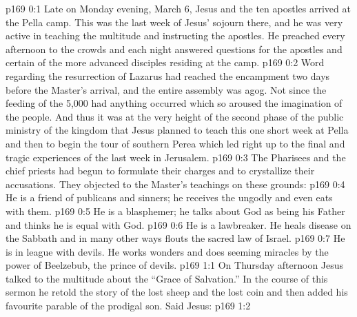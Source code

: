 \author{Midwayer Commission}
\vs p169 0:1 Late on Monday evening, March 6, Jesus and the ten apostles arrived at the Pella camp. This was the last week of Jesus’ sojourn there, and he was very active in teaching the multitude and instructing the apostles. He preached every afternoon to the crowds and each night answered questions for the apostles and certain of the more advanced disciples residing at the camp.
\vs p169 0:2 Word regarding the resurrection of Lazarus had reached the encampment two days before the Master’s arrival, and the entire assembly was agog. Not since the feeding of the 5,000 had anything occurred which so aroused the imagination of the people. And thus it was at the very height of the second phase of the public ministry of the kingdom that Jesus planned to teach this one short week at Pella and then to begin the tour of southern Perea which led right up to the final and tragic experiences of the last week in Jerusalem.
\vs p169 0:3 \pc The Pharisees and the chief priests had begun to formulate their charges and to crystallize their accusations. They objected to the Master’s teachings on these grounds:
\vs p169 0:4 \bibnobreakspace He is a friend of publicans and sinners; he receives the ungodly and even eats with them.
\vs p169 0:5 \bibnobreakspace He is a blasphemer; he talks about God as being his Father and thinks he is equal with God.
\vs p169 0:6 \bibnobreakspace He is a lawbreaker. He heals disease on the Sabbath and in many other ways flouts the sacred law of Israel.
\vs p169 0:7 \bibnobreakspace He is in league with devils. He works wonders and does seeming miracles by the power of Beelzebub, the prince of devils.
\vs p169 1:1 On Thursday afternoon Jesus talked to the multitude about the “Grace of Salvation.” In the course of this sermon he retold the story of the lost sheep and the lost coin and then added his favourite parable of the prodigal son. Said Jesus:
\vs p169 1:2 \pc {}
